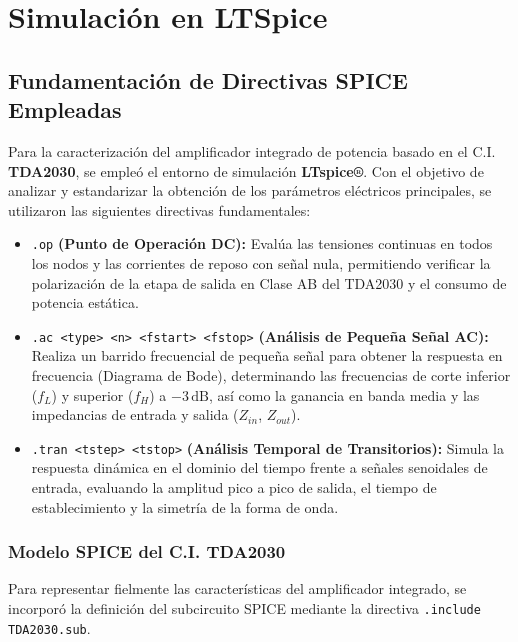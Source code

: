 
\section{Simulación en LTSpice}

\subsection{Fundamentación de Directivas SPICE Empleadas}
Para la caracterización del amplificador integrado de potencia basado en el C.I. \textbf{TDA2030}, se empleó el entorno de simulación \textbf{LTspice®}. Con el objetivo de analizar y estandarizar la obtención de los parámetros eléctricos principales, se utilizaron las siguientes directivas fundamentales:

\begin{itemize}
    \item \texttt{.op} \textbf{(Punto de Operación DC):} Evalúa las tensiones continuas en todos los nodos y las corrientes de reposo con señal nula, permitiendo verificar la polarización de la etapa de salida en Clase AB del TDA2030 y el consumo de potencia estática.
    \item \texttt{.ac <type> <n> <fstart> <fstop>} \textbf{(Análisis de Pequeña Señal AC):} Realiza un barrido frecuencial de pequeña señal para obtener la respuesta en frecuencia (Diagrama de Bode), determinando las frecuencias de corte inferior ($f_L$) y superior ($f_H$) a $-3\,\text{dB}$, así como la ganancia en banda media y las impedancias de entrada y salida ($Z_{in}$, $Z_{out}$).
    \item \texttt{.tran <tstep> <tstop>} \textbf{(Análisis Temporal de Transitorios):} Simula la respuesta dinámica en el dominio del tiempo frente a señales senoidales de entrada, evaluando la amplitud pico a pico de salida, el tiempo de establecimiento y la simetría de la forma de onda.
\end{itemize}

\subsubsection{Modelo SPICE del C.I. TDA2030}
Para representar fielmente las características del amplificador integrado, se incorporó la definición del subcircuito SPICE mediante la directiva \texttt{.include TDA2030.sub}.

